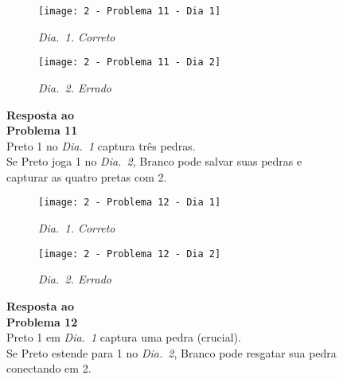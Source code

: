 \vfill

\begin{SCfigure}[][h!]
    \begin{subfigure}[t]{.31\textwidth}
        \texttt{[image: 2 - Problema 11 - Dia 1]}
        \caption*{\emph{Dia.\@~1. Correto}}
    \end{subfigure}
    \hfill
    \begin{subfigure}[t]{.31\textwidth}
        \texttt{[image: 2 - Problema 11 - Dia 2]}
        \caption*{\emph{Dia.\@~2. Errado}}
    \end{subfigure}
    \hfill
    \caption*{\textbf{Resposta ao\\Problema 11}\\\vspace*{.25cm}Preto 1 no \emph{Dia.\@~1} captura três pedras.\\\vspace*{.25cm}Se Preto joga 1 no \emph{Dia.\@~2}, Branco pode salvar suas pedras e capturar as quatro pretas com 2.}
\end{SCfigure}

\vfill

\begin{SCfigure}[][h!]
    \begin{subfigure}[t]{.31\textwidth}
        \texttt{[image: 2 - Problema 12 - Dia 1]}
        \caption*{\emph{Dia.\@~1. Correto}}
    \end{subfigure}
    \hfill
    \begin{subfigure}[t]{.31\textwidth}
        \texttt{[image: 2 - Problema 12 - Dia 2]}
        \caption*{\emph{Dia.\@~2. Errado}}
    \end{subfigure}
    \hfill
    \caption*{\textbf{Resposta ao\\Problema 12}\\\vspace*{.25cm}Preto 1 em \emph{Dia.\@~1} captura uma pedra (crucial).\\\vspace*{.25cm}Se Preto estende para 1 no \emph{Dia.\@~2}, Branco pode resgatar sua pedra conectando em 2.}
\end{SCfigure}

\pagebreak


